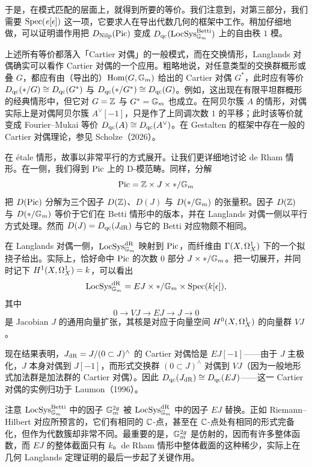 于是，在模式匹配的层面上，就得到所要的等价。我们注意到，对第三部分，我们需要 $\operatorname{Spec}(\mathit{e}[\epsilon])$ 这一项，它要求人在导出代数几何的框架中工作。稍加仔细地做，可以证明谱作用把 $D_{\mathrm{Nilp}}(\operatorname{Pic})$ 变成 $D_{\mathrm{qc}}(\operatorname{LocSys}^{\mathrm{Betti}}_{\mathbb{G}_m})$ 上的自由秩 $1$ 模。

\begin{remark}
上述所有等价都落入「Cartier 对偶」的一般模式，而在交换情形，Langlands 对偶确实可以看作 Cartier 对偶的一个应用。粗略地说，对任意类型的交换群概形或叠 $G$，都应有由（导出的）$\operatorname{Hom}(G,\mathbb{G}_m)$ 给出的 Cartier 对偶 $G^{*}$，此时应有等价 $D_{\mathrm{qc}}(*/G)\cong D_{\mathrm{qc}}(G^{*})$ 与 $D_{\mathrm{qc}}(*/G^{*})\cong D_{\mathrm{qc}}(G)$。例如，这出现在有限平坦群概形的经典情形中，但它对 $G=\mathbb{Z}$ 与 $G^{*}=\mathbb{G}_m$ 也成立。在阿贝尔簇 $A$ 的情形，对偶实际上是对偶阿贝尔簇 $A^{\vee}[-1]$，只是作了上同调次数 $1$ 的平移；此时该等价就变成 Fourier--Mukai 等价 $D_{\mathrm{qc}}(A)\cong D_{\mathrm{qc}}(A^{\vee})$。在 Gestalten 的框架中存在一般的 Cartier 对偶理论，参见 Scholze（2026）。
\end{remark}

在 étale 情形，故事以非常平行的方式展开。让我们更详细地讨论 de Rham 情形。在一侧，我们得到 $\operatorname{Pic}$ 上的 D-模范畴。同样，分解
\[ \operatorname{Pic}=\mathbb{Z}\times J\times */\mathbb{G}_m \]
把 $D(\operatorname{Pic})$ 分解为三个因子 $D(\mathbb{Z})$、$D(J)$ 与 $D(*/\mathbb{G}_m)$ 的张量积。因子 $D(\mathbb{Z})$ 与 $D(*/\mathbb{G}_m)$ 等价于它们在 Betti 情形中的版本，并在 Langlands 对偶一侧以平行方式处理。然而 $D(J)=D_{\mathrm{qc}}(J_{\mathrm{dR}})$ 与它的 Betti 对应物颇不相同。

在 Langlands 对偶一侧，$\operatorname{LocSys}^{\mathrm{dR}}_{\mathbb{G}_m}$ 映射到 $\operatorname{Pic}$，而纤维由 $\Gamma(X,\Omega^{1}_{X})$ 下的一个拟挠子给出。实际上，恰好命中 $\operatorname{Pic}$ 的次数 $0$ 部分 $J\times*/\mathbb{G}_m$。把一切展开，并同时记下 $H^{1}(X,\Omega^{1}_{X})=k$，可以看出
\[ \operatorname{LocSys}^{\mathrm{dR}}_{\mathbb{G}_m}=EJ\times*/\mathbb{G}_m\times\operatorname{Spec}(k[\epsilon]), \]
其中
\[ 0\to V J\to EJ\to J\to 0 \]
是 Jacobian $J$ 的通用向量扩张，其核是对应于向量空间 $H^{0}(X,\Omega^{1}_{X})$ 的向量群 $V J$。

现在结果表明，$J_{\mathrm{dR}}=J/(0\subset J)^{\wedge}$ 的 Cartier 对偶恰是 $EJ[-1]$——由于 $J$ 主极化，$J$ 本身对偶到 $J[-1]$，而形式交换群 $(0\subset J)^{\wedge}$ 对偶到 $V J$（因为一般地形式加法群是加法群的 Cartier 对偶）。因此 $D_{\mathrm{qc}}(J_{\mathrm{dR}})\cong D_{\mathrm{qc}}(EJ)$——这一 Cartier 对偶的实例归功于 Laumon（1996）。

注意 $\operatorname{LocSys}^{\mathrm{Betti}}_{\mathbb{G}_m}$ 中的因子 $\mathbb{G}_m^{2g}$ 被 $\operatorname{LocSys}^{\mathrm{dR}}_{\mathbb{G}_m}$ 中的因子 $EJ$ 替换。正如 Riemann--Hilbert 对应所预言的，它们有相同的 $\mathbb{C}$-点，甚至在 $\mathbb{C}$-点处有相同的形式完备化，但作为代数簇却非常不同。最重要的是，$\mathbb{G}_m^{2g}$ 是仿射的，因而有许多整体函数，而 $EJ$ 的整体截面只有 $k$。de Rham 情形中整体截面的这种稀少，实际上在几何 Langlands 定理证明的最后一步起了关键作用。
